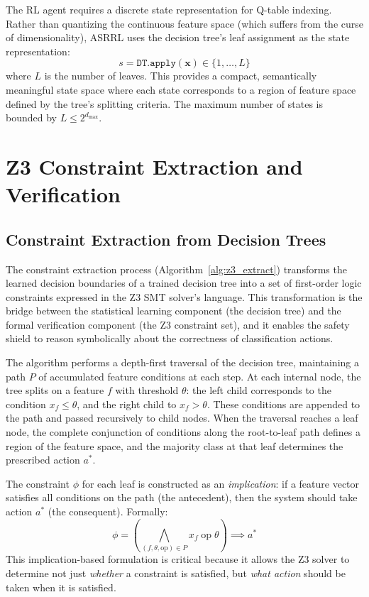 \documentclass[12pt, letterpaper, oneside]{report}
\newcommand{\ASRRL}{\textsc{ASRRL}}
\newcommand{\bx}{\mathbf{x}}
\begin{document}
The RL agent requires a discrete state representation for Q-table indexing. Rather than quantizing the continuous feature space (which suffers from the curse of dimensionality), \ASRRL{} uses the decision tree's leaf assignment as the state representation:
\begin{equation}
\label{eq:discretization}
s = \texttt{DT.apply}(\bx) \in \{1, \ldots, L\}
\end{equation}
where $L$ is the number of leaves. This provides a compact, semantically meaningful state space where each state corresponds to a region of feature space defined by the tree's splitting criteria. The maximum number of states is bounded by $L \leq 2^{d_{\max}}$.


\section{Z3 Constraint Extraction and Verification}
\label{sec:z3_constraints}

\subsection{Constraint Extraction from Decision Trees}

The constraint extraction process (Algorithm~\ref{alg:z3_extract}) transforms the learned decision boundaries of a trained decision tree into a set of first-order logic constraints expressed in the Z3 SMT solver's language. This transformation is the bridge between the statistical learning component (the decision tree) and the formal verification component (the Z3 constraint set), and it enables the safety shield to reason symbolically about the correctness of classification actions.

The algorithm performs a depth-first traversal of the decision tree, maintaining a path $P$ of accumulated feature conditions at each step. At each internal node, the tree splits on a feature $f$ with threshold $\theta$: the left child corresponds to the condition $x_f \leq \theta$, and the right child to $x_f > \theta$. These conditions are appended to the path and passed recursively to child nodes. When the traversal reaches a leaf node, the complete conjunction of conditions along the root-to-leaf path defines a region of the feature space, and the majority class at that leaf determines the prescribed action $a^*$.

The constraint $\phi$ for each leaf is constructed as an \emph{implication}: if a feature vector satisfies all conditions on the path (the antecedent), then the system should take action $a^*$ (the consequent). Formally:
\begin{equation}
\phi = \left(\bigwedge_{(f, \theta, \text{op}) \in P} x_f \;\text{op}\; \theta\right) \implies a^*
\end{equation}
This implication-based formulation is critical because it allows the Z3 solver to determine not just \emph{whether} a constraint is satisfied, but \emph{what action} should be taken when it is satisfied.
\end{document}
